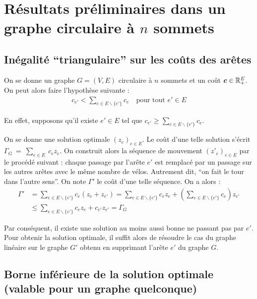 \chapter{Résultats préliminaires dans un graphe circulaire à $n$ sommets}
\label{Résultats préliminaires}

\section{Inégalité ``triangulaire'' sur les coûts des arêtes}
\label{sec: Inégalité triangulaire}

On se donne un graphe $G=(V,E)$ circulaire à $n$ sommets et un coût $\boldsymbol{c} \in \mathbb{R}^E_+$. On peut alors faire l'hypothèse suivante :
\begin{gather}\label{Inégalité Triangulaire}
  c_{e'}<\sum_{e \in E \backslash \{e'\}} c_e \quad \text{pour tout } e' \in E
\end{gather}

En effet, supposons qu'il existe $e' \in E$ tel que $c_{e'} \ge \sum_{e \in E \backslash \{e'\}} c_e$.

On se donne une solution optimale $(z_e)_{e \in E}$. Le coût d'une telle solution s'écrit $\Gamma_{G}~=~\sum_{e \in E}~c_ez_e$. On construit alors la séquence de mouvement $(z'_e)_{e \in E}$ par le procédé suivant : chaque passage par l'arête $e'$ est remplacé par un passage sur les autres arêtes avec le même nombre de vélos. Autrement dit, ``on fait le tour dans l'autre sens''. On note $\Gamma'$ le coût d'une telle séquence. On a alors :
\begin{align*}
  \Gamma' &= \sum_{e \in E \backslash \{e'\}} c_e (z_e + z_{e'}) = \sum_{e \in E \backslash \{e'\}} c_ez_e + \left(\sum_{e \in E \backslash \{e'\}} c_{e}\right)z_{e'} \\
     &\le \sum_{e \in E \backslash \{e'\}} c_ez_e + c_{e'}z_{e'} = \Gamma_{G}
\end{align*}

Par conséquent, il existe une solution au moins aussi bonne ne passant pas par $e'$. Pour obtenir la solution optimale, il suffit alors de résoudre le cas du graphe linéaire sur le graphe $G'$ obtenu en supprimant l'arête $e'$ du graphe $G$.

\section{Borne inférieure de la solution optimale (valable pour un graphe quelconque)}
\label{Borne inf générale}

